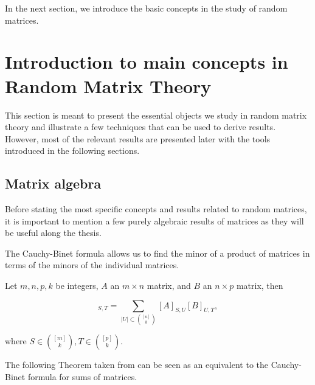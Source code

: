 In the next section, we introduce the basic concepts in the study of random matrices.

\section{Introduction to main concepts in Random Matrix Theory}

This section is meant to present the essential objects we study in random matrix theory and illustrate a few techniques that can be used to derive results. However, most of the relevant results are presented later with the tools introduced in the following sections.



\subsection{Matrix algebra}

Before stating the most specific concepts and results related to random matrices, it is important to mention a few purely algebraic results of matrices as they will be useful along the thesis.

The Cauchy-Binet formula allows us to find the minor of a product of matrices in terms of the minors of the individual matrices.

\begin{theorem} \label{thm:cauchy_binet}
    Let $m,n,p,k$ be integers, $A$ an $m\times n$ matrix, and $B$ an $n\times p$ matrix, then

    \begin{equation*}
        [AB]_{S,T} = \sum_{|U|\subset \binom{[n]}{k}} [A]_{S,U} [B]_{U,T},
    \end{equation*}

    \noindent where $S\in \binom{[m]}{k}, T \in \binom{[p]}{k}$.
\end{theorem}

The following Theorem taken from \cite{article:finitefree} can be seen as an equivalent to the Cauchy-Binet formula for sums of matrices.

